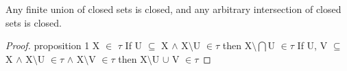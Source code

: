 \documentclass{article}
\begin{document}
  \begin{proposition}
      Any finite union of closed sets is closed, and any arbitrary intersection of closed sets is closed.
  \end{proposition}

  \begin{proof}
  	proposition 1
  	\newline
	X $\in$ $\tau$
	\newline
	If U $\subseteq$ X $\wedge$ X$\setminus$U $\in \tau$ then X$\setminus\bigcap$U $\in \tau$
	\newline
	If U, V $\subseteq$ X $\wedge$ X$\setminus$U $\in \tau$  $\wedge$ X$\setminus$V $\in \tau$ then X$\setminus$U $\cup$ V $\in \tau$
  \end{proof}
\end{document}
